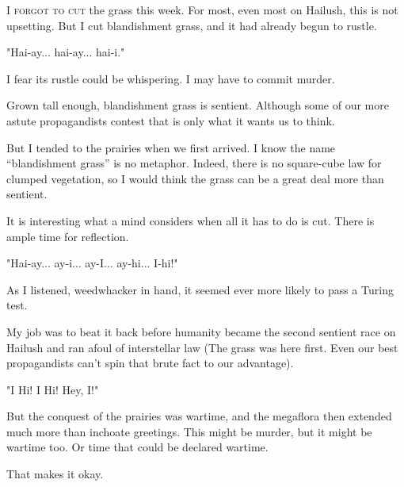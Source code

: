 
\lettrine{I}{ forgot to cut} the grass this week. For most, even most on Hailush, this is not upsetting. But I cut
blandishment grass, and it had already begun to rustle.

"Hai-ay... hai-ay... hai-i."

I fear its rustle could be whispering. I may have to commit murder.

Grown tall enough, blandishment grass is sentient. Although some of our more astute
propagandists contest that is only what it wants us to think.

But I tended to the prairies when we first arrived. I know the name “blandishment grass” is no
metaphor. Indeed, there is no square-cube law for clumped vegetation, so I would think the grass can be a
great deal more than sentient.

It is interesting what a mind considers when all it has to do is cut. There is ample time for
reflection.

"Hai-ay... ay-i... ay-I... ay-hi... I-hi!"

As I listened, weedwhacker in hand, it seemed ever more likely to pass a Turing test.

My job was to beat it back before humanity became the second sentient race on Hailush and ran
afoul of interstellar law (The grass was here first. Even our best propagandists can't spin that brute fact to
our advantage).

"I Hi! I Hi! Hey, I!"

But the conquest of the prairies was wartime, and the megaflora then extended much more than
inchoate greetings. This might be murder, but it might be wartime too. Or time that could be declared
wartime.

That makes it okay.
